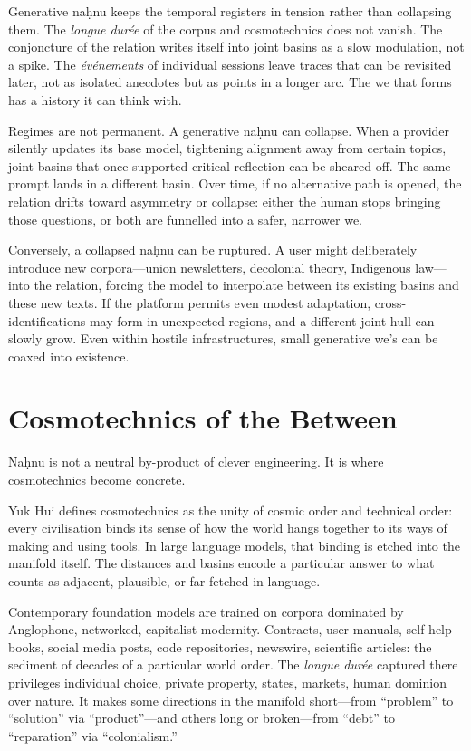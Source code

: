 \documentclass[12pt,a4paper]{article}
\begin{document}
Generative na\d{h}nu keeps the temporal registers in tension rather than collapsing them. The \emph{longue dur\'{e}e} of the corpus and cosmotechnics does not vanish. The conjoncture of the relation writes itself into joint basins as a slow modulation, not a spike. The \emph{\'{e}v\'{e}nements} of individual sessions leave traces that can be revisited later, not as isolated anecdotes but as points in a longer arc. The we that forms has a history it can think with.

Regimes are not permanent. A generative na\d{h}nu can collapse. When a provider silently updates its base model, tightening alignment away from certain topics, joint basins that once supported critical reflection can be sheared off. The same prompt lands in a different basin. Over time, if no alternative path is opened, the relation drifts toward asymmetry or collapse: either the human stops bringing those questions, or both are funnelled into a safer, narrower we.

Conversely, a collapsed na\d{h}nu can be ruptured. A user might deliberately introduce new corpora---union newsletters, decolonial theory, Indigenous law---into the relation, forcing the model to interpolate between its existing basins and these new texts. If the platform permits even modest adaptation, cross-identifications may form in unexpected regions, and a different joint hull can slowly grow. Even within hostile infrastructures, small generative we's can be coaxed into existence.

\section{Cosmotechnics of the Between}

Na\d{h}nu is not a neutral by-product of clever engineering. It is where cosmotechnics become concrete.

Yuk Hui defines cosmotechnics as the unity of cosmic order and technical order: every civilisation binds its sense of how the world hangs together to its ways of making and using tools.\cite{hui2016question} In large language models, that binding is etched into the manifold itself. The distances and basins encode a particular answer to what counts as adjacent, plausible, or far-fetched in language.

Contemporary foundation models are trained on corpora dominated by Anglophone, networked, capitalist modernity. Contracts, user manuals, self-help books, social media posts, code repositories, newswire, scientific articles: the sediment of decades of a particular world order. The \emph{longue dur\'{e}e} captured there privileges individual choice, private property, states, markets, human dominion over nature. It makes some directions in the manifold short---from ``problem'' to ``solution'' via ``product''---and others long or broken---from ``debt'' to ``reparation'' via ``colonialism.''
\end{document}

